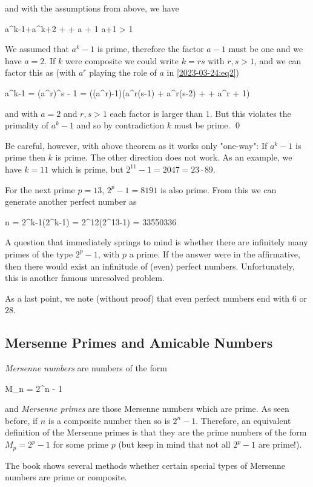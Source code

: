 and with the assumptions from above, we have

\bee
a^{k-1}+a^{k+2} + \cdots + a + 1 \geq a+1 > 1
\eee

We assumed that $a^k-1$ is prime, therefore the factor $a-1$ must be one and we have $a=2$. If $k$ were composite we could write $k=rs$ with $r, s > 1$, and we can factor this as (with $a^r$ playing the role of $a$ in \eqref{2023-03-24:eq2})

\bee
a^k-1 = (a^r)^s - 1 = ((a^r)-1)(a^{r(s-1)} + a^{r(s-2)} + \cdots + a^{r} + 1)
\eee

and with $a=2$ and $r, s > 1$ each factor is larger than $1$. But this violates the primality of $a^k-1$ and so by contradiction $k$ must be prime. \qed

Be careful, however, with above theorem as it works only "one-way": If $a^k-1$ is prime  then $k$ is prime. The other direction does not work. As an example, we have $k=11$ which is prime, but $2^{11}-1 = 2047 = 23 \cdot 89$.

For the next prime $p=13$, $2^p-1 = 8191$ is also prime. From this we can generate another perfect number as

\bee
n = 2^{k-1}(2^k-1) = 2^{12}(2^{13}-1) = 33550336
\eee

A question that immediately springs to mind is whether there are inﬁnitely many primes of the type $2^p-1$, with $p$ a prime. If the answer were in the afﬁrmative, then there would exist an inﬁnitude of (even) perfect numbers. Unfortunately, this is another famous unresolved problem.

As a last point, we note (without proof) that even perfect numbers end with $6$ or $28$.

\subsection{Mersenne Primes and Amicable Numbers}

\emph{Mersenne numbers} are numbers of the form

\bee
M_n = 2^n - 1
\eee

and \emph{Mersenne primes} are those Mersenne numbers which are prime. As seen before, if $n$ is a composite number then so is $2^n - 1$. Therefore, an equivalent definition of the Mersenne primes is that they are the prime numbers of the form $M_p = 2^p - 1$ for some prime $p$ (but keep in mind that not all $2^p-1$ are prime!).

The book shows several methods whether certain special types of Mersenne numbers are prime or composite.

